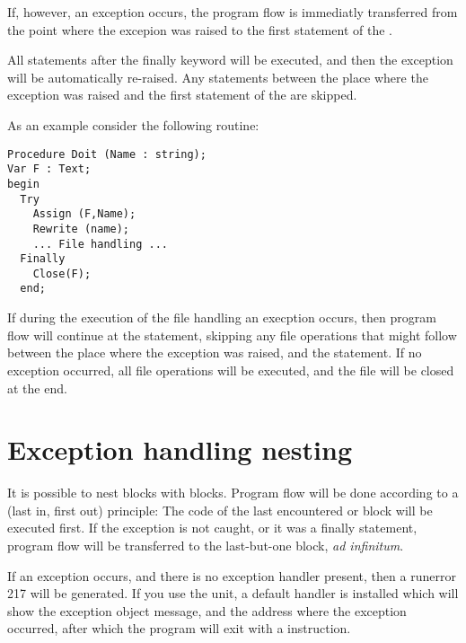 \documentclass{report}
\begin{document}
If, however, an exception occurs, the program flow is immediatly
transferred from the point where the excepion was raised to the first
statement of the .

All statements after the finally keyword will be executed, and then
the exception will be automatically re-raised. Any statements between the
place where the exception was raised and the first statement of the
 are skipped.

As an example consider the following routine:
\begin{verbatim}
Procedure Doit (Name : string);
Var F : Text;
begin
  Try
    Assign (F,Name);
    Rewrite (name);
    ... File handling ...
  Finally
    Close(F);
  end;
\end{verbatim}
If during the execution of the file handling an execption occurs, then
program flow will continue at the  statement, skipping any
file operations that might follow between the place where the exception
was raised, and the  statement.
If no exception occurred, all file operations will be executed, and the file
will be closed at the end.


\section{Exception handling nesting}
It is possible to nest  blocks with 
blocks. Program flow will be done according to a  (last in, first
out) principle: The code of the last encountered  or
  block will be executed first. If the exception is not
caught, or it was a finally statement, program flow will be transferred to
the last-but-one block, {\em ad infinitum}.

If an exception occurs, and there is no exception handler present, then a
runerror 217 will be generated. If you use the  unit, a default
handler is installed which will show the exception object message, and the
address where the exception occurred, after which the program will exit with
a  instruction.


\end{document}
